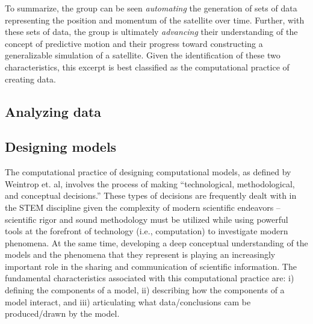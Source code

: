 \documentclass{msuphddissertation}
\begin{document}
\begin{doublespace}
To summarize, the group can be seen \textit{automating} the generation of sets of data representing the position and momentum of the satellite over time.  Further, with these sets of data, the group is ultimately \textit{advancing} their understanding of the concept of predictive motion and their progress toward constructing a generalizable simulation of a satellite.  Given the identification of these two characteristics, this excerpt is best classified as the computational practice of creating data.

\subsection{Analyzing data}

\subsection{Designing models}

The computational practice of designing computational models, as defined by Weintrop et. al, involves the process of making ``technological, methodological, and conceptual decisions.''  These types of decisions are frequently dealt with in the STEM discipline given the complexity of modern scientific endeavors -- scientific rigor and sound methodology must be utilized while using powerful tools at the forefront of technology (i.e., computation) to investigate modern phenomena.  At the same time, developing a deep conceptual understanding of the models and the phenomena that they represent is playing an increasingly important role in the sharing and communication of scientific information.  The fundamental characteristics associated with this computational practice are: i) defining the components of a model, ii) describing how the components of a model interact, and iii) articulating what data/conclusions cam be produced/drawn by the model.


\end{doublespace}
\end{document}
